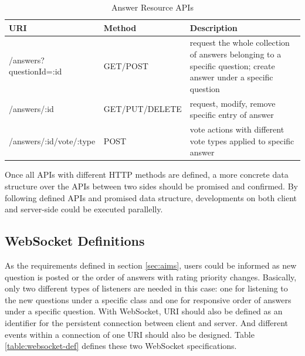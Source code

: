 \begin{enumerate}
\begin{table}[!htbp]
\begin{tabularx}{\textwidth}{@{}llX@{}}
\toprule
URI                                 & Method         & Description                                                                                                                                                 \\ \midrule
/answers?questionId=:id             & GET/POST       & request the whole collection of answers belonging to a specific question; create answer under a specific question\\
/answers/:id                        & GET/PUT/DELETE & request, modify, remove specific entry of answer                                                                                                            \\
/answers/:id/vote/:type             & POST           & vote actions with different vote types applied to specific answer                                                                                           \\ \bottomrule
\end{tabularx}
\caption{Answer Resource APIs}
\label{table:answer-resources-apis}
\end{table}

\end{enumerate}

Once all APIs with different HTTP methods are defined, a more concrete data structure over the APIs between two sides should be promised and confirmed. By following defined APIs and promised data structure, developments on both client and server-side could be executed parallelly.

\subsection{WebSocket Definitions} \label{subsection:websocket-definition-data-concept}

As the requirements defined in section \ref{sec:aims}, users could be informed as new question is posted or the order of answers with rating priority changes. Basically, only two different types of listeners are needed in this case: one for listening to the new questions under a specific class and one for responsive order of answers under a specific question. With WebSocket, URI should also be defined as an identifier for the persistent connection between client and server. And different events within a connection of one URI should also be designed. Table \ref{table:websocket-def} defines these two WebSocket specifications.

